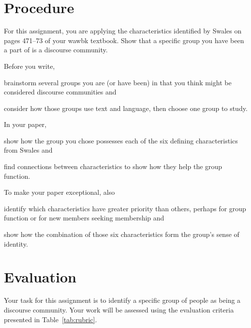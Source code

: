 \documentclass[10pt,oneside,twocolumn]{amsart}	%
\begin{document}
	\section{Procedure} %
	\label{sec:procedure}
		For this assignment, you are  applying the  characteristics identified by Swales on pages 471–73 of your \ac{wawbk} textbook. Show that a specific group you have been a part of is a discourse community.
		\begin{compactitem}
			\item Before you write,
		\begin{compactenum}
			\item brainstorm several groups you are (or have been) in that you think might be considered discourse communities and
			\item consider how those groups use text and language, then choose one group to study. %
		\end{compactenum}
		\item In your paper,
		\begin{compactenum}
			\item show how the group you chose possesses each of the six defining characteristics from Swales and
			\item find connections between characteristics to show how they help the group function.
		\end{compactenum}
		\item To make your paper exceptional, also
		\begin{compactenum}
			\item identify which characteristics have greater priority than others, perhaps for group function or for new members seeking membership and
			\item show how the combination of those six characteristics form the group's sense of identity.
		\end{compactenum}
		\end{compactitem}

	\section{Evaluation} %
	\label{sec:rubric}
	Your task for this assignment is to identify a specific group of people as being a discourse community. Your work will be assessed using the evaluation criteria presented in Table~\ref{tab:rubric}.
\end{document}
